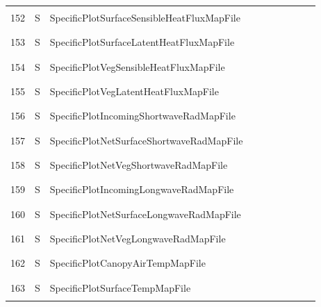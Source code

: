 \begin{longtable}{|c|c|l|c|c|c|c|p{}|c|p{}|}
&&&&&&&&&\\\hline%
&&&&&&&&&\\
152 & S & SpecificPlotSurfaceSensibleHeatFluxMapFile & & & & & & & \\
&&&&&&&&&\\\hline%
&&&&&&&&&\\
153 & S & SpecificPlotSurfaceLatentHeatFluxMapFile & & & & & & & \\
&&&&&&&&&\\\hline%
&&&&&&&&&\\
154 & S & SpecificPlotVegSensibleHeatFluxMapFile & & & & & & & \\
&&&&&&&&&\\\hline%
&&&&&&&&&\\
155 & S & SpecificPlotVegLatentHeatFluxMapFile & & & & & & & \\
&&&&&&&&&\\\hline%
&&&&&&&&&\\
156 & S & SpecificPlotIncomingShortwaveRadMapFile & & & & & & & \\
&&&&&&&&&\\\hline%
&&&&&&&&&\\
157 & S & SpecificPlotNetSurfaceShortwaveRadMapFile & & & & & & & \\
&&&&&&&&&\\\hline%
&&&&&&&&&\\
158 & S & SpecificPlotNetVegShortwaveRadMapFile & & & & & & & \\
&&&&&&&&&\\\hline%
&&&&&&&&&\\
159 & S & SpecificPlotIncomingLongwaveRadMapFile & & & & & & & \\
&&&&&&&&&\\\hline%
&&&&&&&&&\\
160 & S & SpecificPlotNetSurfaceLongwaveRadMapFile & & & & & & & \\
&&&&&&&&&\\\hline%
&&&&&&&&&\\
161 & S & SpecificPlotNetVegLongwaveRadMapFile & & & & & & & \\
&&&&&&&&&\\\hline%
&&&&&&&&&\\
162 & S & SpecificPlotCanopyAirTempMapFile & & & & & & & \\
&&&&&&&&&\\\hline%
&&&&&&&&&\\
163 & S & SpecificPlotSurfaceTempMapFile & & & & & & & \\
&&&&&&&&&\\\hline%

\end{longtable}
